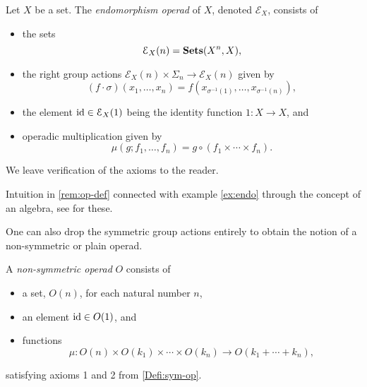\begin{example}\label{ex:endo}
Let $X$ be a set. The \emph{endomorphism operad} of $X$, denoted $\mathcal{E}_X$, consists of 
\begin{itemize}
\item the sets
\[
\mathcal{E}_X(n) = \mathbf{Sets}(X^n, X),
\]
\item the right group actions $\mathcal{E}_X(n) \times \Sigma_n \to \mathcal{E}_X(n)$ given by
\[
(f \cdot \sigma)(x_1, \ldots, x_n) = f( x_{\sigma^{-1}(1)}, \ldots, x_{\sigma^{-1}(n)}),
\]
\item the element $\textrm{id} \in \mathcal{E}_X(1)$ being the identity function $1 \colon X \to X$, and
\item operadic multiplication given by
\[
\mu(g; f_1, \ldots, f_n) = g \circ (f_1 \times \cdots \times f_n).
\]
\end{itemize}
We leave verification of the axioms to the reader.
\end{example}

\begin{rem}
Intuition in \cref{rem:op-def} connected with example \cref{ex:endo} through the concept of an algebra, see for these.
\end{rem}

One can also drop the symmetric group actions entirely to obtain the notion of a non-symmetric or plain operad.

\begin{Defi}\label{Defi:non-sym-op}
A \emph{non-symmetric operad} $O$ consists of 
\begin{itemize}
\item a set, $O(n)$, for each natural number $n$,
\item an element $\textrm{id} \in O(1)$, and
\item functions
  \[
    \mu \colon  O(n) \times O(k_{1}) \times \cdots \times O(k_{n}) \rightarrow O(k_{1} + \cdots + k_{n}),
  \]
\end{itemize}
satisfying axioms 1 and 2 from \cref{Defi:sym-op}.
\end{Defi}

